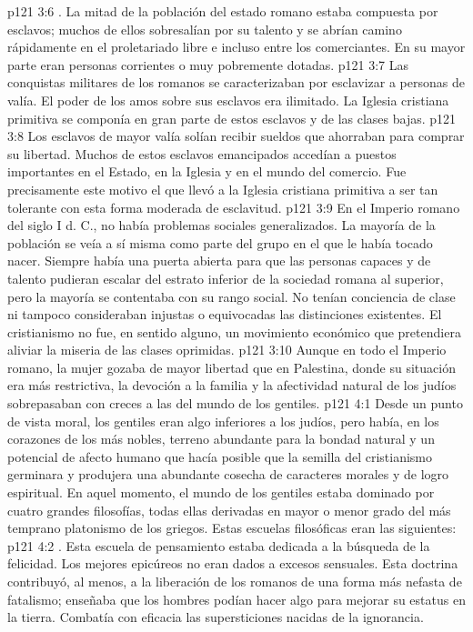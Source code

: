 \vs p121 3:6 . La mitad de la población del estado romano estaba compuesta por esclavos; muchos de ellos sobresalían por su talento y se abrían camino rápidamente en el proletariado libre e incluso entre los comerciantes. En su mayor parte eran personas corrientes o muy pobremente dotadas.
\vs p121 3:7 Las conquistas militares de los romanos se caracterizaban por esclavizar a personas de valía. El poder de los amos sobre sus esclavos era ilimitado. La Iglesia cristiana primitiva se componía en gran parte de estos esclavos y de las clases bajas.
\vs p121 3:8 Los esclavos de mayor valía solían recibir sueldos que ahorraban para comprar su libertad. Muchos de estos esclavos emancipados accedían a puestos importantes en el Estado, en la Iglesia y en el mundo del comercio. Fue precisamente este motivo el que llevó a la Iglesia cristiana primitiva a ser tan tolerante con esta forma moderada de esclavitud.
\vs p121 3:9 \pc En el Imperio romano del siglo I d. C., no había problemas sociales generalizados. La mayoría de la población se veía a sí misma como parte del grupo en el que le había tocado nacer. Siempre había una puerta abierta para que las personas capaces y de talento pudieran escalar del estrato inferior de la sociedad romana al superior, pero la mayoría se contentaba con su rango social. No tenían conciencia de clase ni tampoco consideraban injustas o equivocadas las distinciones existentes. El cristianismo no fue, en sentido alguno, un movimiento económico que pretendiera aliviar la miseria de las clases oprimidas.
\vs p121 3:10 Aunque en todo el Imperio romano, la mujer gozaba de mayor libertad que en Palestina, donde su situación era más restrictiva, la devoción a la familia y la afectividad natural de los judíos sobrepasaban con creces a las del mundo de los gentiles.
\vs p121 4:1 Desde un punto de vista moral, los gentiles eran algo inferiores a los judíos, pero había, en los corazones de los más nobles, terreno abundante para la bondad natural y un potencial de afecto humano que hacía posible que la semilla del cristianismo germinara y produjera una abundante cosecha de caracteres morales y de logro espiritual. En aquel momento, el mundo de los gentiles estaba dominado por cuatro grandes filosofías, todas ellas derivadas en mayor o menor grado del más temprano platonismo de los griegos. Estas escuelas filosóficas eran las siguientes:
\vs p121 4:2 . Esta escuela de pensamiento estaba dedicada a la búsqueda de la felicidad. Los mejores epicúreos no eran dados a excesos sensuales. Esta doctrina contribuyó, al menos, a la liberación de los romanos de una forma más nefasta de fatalismo; enseñaba que los hombres podían hacer algo para mejorar su estatus en la tierra. Combatía con eficacia las supersticiones nacidas de la ignorancia.

